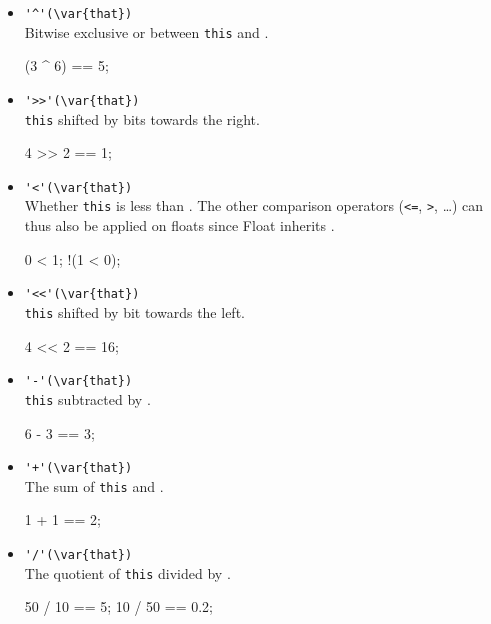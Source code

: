 \begin{itemize}
\item \lstinline|'^'(\var{that})|\\
  Bitwise exclusive or between \lstinline|this| and .
\begin{urbiassert}[firstnumber=last]
(3 ^ 6) == 5;
\end{urbiassert}

\item \lstinline|'>>'(\var{that})|\\%
  \lstinline|this| shifted by  bits towards the right.
\begin{urbiassert}[firstnumber=last]
4 >> 2 == 1;
\end{urbiassert}

\item \lstinline|'<'(\var{that})|\\
  Whether \lstinline|this| is less than . The other comparison
  operators (\lstinline|<=|, \lstinline|>|, \ldots) can thus also be
  applied on floats since Float inherits .
\begin{urbiassert}[firstnumber=last]
  0 < 1;
!(1 < 0);
\end{urbiassert}

\item \lstinline|'<<'(\var{that})|\\
  \lstinline|this| shifted by  bit towards the left.
\begin{urbiassert}[firstnumber=last]
4 << 2 == 16;
\end{urbiassert}

\item \lstinline|'-'(\var{that})|\\
  \lstinline|this| subtracted by .
\begin{urbiassert}[firstnumber=last]
6 - 3 == 3;
\end{urbiassert}

\item \lstinline|'+'(\var{that})|\\
  The sum of \lstinline|this| and .
\begin{urbiassert}[firstnumber=last]
1 + 1 == 2;
\end{urbiassert}

\item \lstinline|'/'(\var{that})|\\
  The quotient of \lstinline|this| divided by .
\begin{urbiassert}[firstnumber=last]
50 / 10 == 5;
10 / 50 == 0.2;
\end{urbiassert}


\end{itemize}
